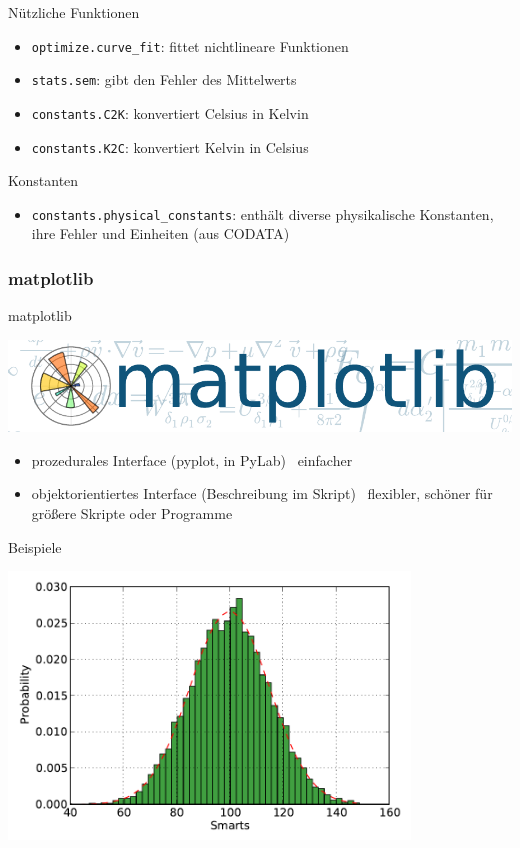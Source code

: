 \begin{frame}{Nützliche Funktionen}
  \begin{itemize}
    \item \texttt{optimize.curve\_fit}: fittet nichtlineare Funktionen
    \item \texttt{stats.sem}: gibt den Fehler des Mittelwerts
    \item \texttt{constants.C2K}: konvertiert Celsius in Kelvin
    \item \texttt{constants.K2C}: konvertiert Kelvin in Celsius
  \end{itemize}
\end{frame}

\begin{frame}{Konstanten}
  \begin{itemize}
    \item \texttt{constants.physical\_constants}: enthält diverse physikalische Konstanten, ihre Fehler und Einheiten (aus CODATA)
  \end{itemize}
\end{frame}

\subsubsection{matplotlib}
\begin{frame}{matplotlib}
  \begin{center}
    \includegraphics[width=\textwidth]{../Notes/img/matplotlib.pdf}
  \end{center}
  \begin{itemize}
    \item prozedurales Interface (pyplot, in PyLab) \mdash\ einfacher
    \item objektorientiertes Interface (Beschreibung im Skript) \mdash\ flexibler, schöner für größere Skripte oder Programme
  \end{itemize}
\end{frame}

\begin{frame}{Beispiele}
  \begin{center}
    \includegraphics[width=0.8\textwidth]{img/matplotlib/hist.pdf}
  \end{center}
\end{frame}

